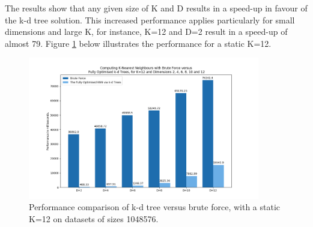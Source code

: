 
The results show that any given size of K and D results in a speed-up in favour of the k-d tree solution. This increased performance applies particularly for small dimensions and large K, for instance, K=12 and D=2 result in a speed-up of almost 79. Figure \ref{fig:b3} below illustrates the performance for a static K=12.


\begin{figure}[H]
\centering
\includegraphics[width=0.9\textwidth]{pics/plot-figs/new-brute-k12.png}
\caption{Performance comparison of k-d tree versus brute force, with a static K=12 on datasets of sizes 1048576.}
\label{fig:b3}
\end{figure}










